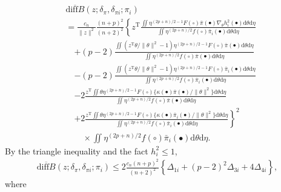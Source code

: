 \documentclass[preprint,11pt]{imsart}
\numberwithin{equation}{section}
\theoremstyle{plain}
\theoremstyle{definition}
\theoremstyle{remark}
\def\T{{ \mathrm{\scriptscriptstyle T} }}
\newcommand{\rd}{\mathrm{d}}
\newcommand{\oldiff}{\overline{\mathrm{diff}B}}
\begin{document}
\begin{align*}
& \oldiff(z;\delta_\pi,\delta_{\pi i};\pi_i) \\ 
 &=\frac{c_n}{\|z\|^2}\frac{(n+p)^2}{(n+2)^2}\left\{
z^\T\frac{\iint   \eta^{(2p+n)/2-1} F(\circ)
 \bar{\pi}(\bullet)\nabla_\theta h_i^2(\bullet) \rd \theta   \rd \eta} 
{\iint  \eta^{(2p+n)/2} f(\circ) \bar{\pi}_i(\bullet) \rd \theta   \rd \eta} \right. \\
&\quad \left. +(p-2) \frac{
 \iint  (z^\T\theta/\|\theta\|^2-1) \eta^{(2p+n)/2-1} F(\circ)
 \bar{\pi}(\bullet) \rd \theta   \rd \eta }
 {\iint  \eta^{(2p+n)/2} f(\circ) \bar{\pi}(\bullet) \rd \theta   \rd \eta} \right. \\
 &\quad \left. -
 (p-2) \frac{
 \iint  (z^\T\theta/\|\theta\|^2-1) \eta^{(2p+n)/2-1} F(\circ)
 \bar{\pi}_i(\bullet) \rd \theta   \rd \eta }
 {\iint  \eta^{(2p+n)/2} f(\circ) \bar{\pi}_i(\bullet) \rd \theta   \rd \eta} \right. \\
& \quad \left. -
2\frac{z^\T\iint  \theta\eta^{(2p+n)/2-1} F(\circ)
 \{\kappa(\bullet)\bar{\pi}(\bullet)/\|\theta\|^2\} \rd \theta   \rd \eta}
 {\iint  \eta^{(2p+n)/2} f(\circ) \bar{\pi}(\bullet) \rd \theta   \rd \eta} \right. \\
& \quad \left. +
2\frac{z^\T\iint  \theta\eta^{(2p+n)/2-1} F(\circ)
 \{\kappa(\bullet)\bar{\pi}_i(\bullet)/\|\theta\|^2\} \rd \theta   \rd \eta}
 {\iint  \eta^{(2p+n)/2} f(\circ) \bar{\pi}_i(\bullet) \rd \theta   \rd \eta} 
\right\}^2 \\
&\qquad\times \iint\eta^{(2p+n)/2} f(\circ) \bar{\pi}_i(\bullet) \rd \theta   \rd \eta .
\end{align*}
By the triangle inequality and the fact $h_i^2\leq 1$,
\begin{align*}
 \oldiff(z;\delta_\pi,\delta_{\pi i};\pi_i)  
\leq 2\frac{c_n(n+p)^2}{(n+2)^2}\left\{\Delta_{1i}+(p-2)^2\Delta_{3i}
 +4\Delta_{4i}\right\},
\end{align*}
where 
\end{document}
